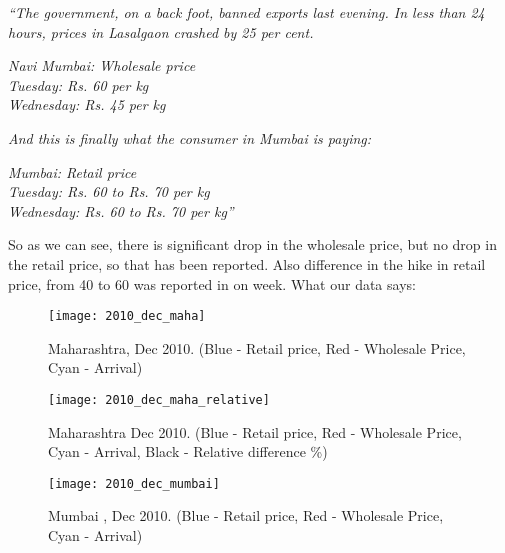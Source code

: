 \textit{“The government, on a back foot, banned exports last evening. In less than 24 hours, prices in Lasalgaon crashed by 25 per cent.}\\
\begin{center}
\textit{Navi Mumbai: Wholesale price } \\
\textit{Tuesday: Rs. 60 per kg }\\
\textit{Wednesday: Rs. 45 per kg }\\
\end{center}
\textit{And this is finally what the consumer in Mumbai is paying:}\\
\begin{center}
\textit{Mumbai: Retail price}\\
\textit{Tuesday: Rs. 60 to Rs. 70 per kg}\\
\textit{Wednesday: Rs. 60 to Rs. 70 per kg” }\\
\end{center}
So as we can see, there is significant drop in the wholesale price, but no drop in the retail price, so that has been reported. Also difference in the hike in retail price, from 40 to 60 was reported in on week. What our data says:

\begin{figure}[here]
\begin{center}	
\texttt{[image: 2010\_dec\_maha]} 
\caption{Maharashtra, Dec 2010. (Blue - Retail price, Red - Wholesale Price, Cyan - Arrival)}
\label{fig:MaharashtraDec2010}
\end{center}
\end{figure}

\begin{figure}[here]
\begin{center}	
\texttt{[image: 2010\_dec\_maha\_relative]} 
\caption{Maharashtra Dec 2010. (Blue - Retail price, Red - Wholesale Price, Cyan - Arrival, Black - Relative difference \%)}
\label{fig:MaharashtraDec2010Relativedifference}
\end{center}
\end{figure}

\begin{figure}[here]
\begin{center}	
\texttt{[image: 2010\_dec\_mumbai]} 
\caption{Mumbai , Dec 2010. (Blue - Retail price, Red - Wholesale Price, Cyan - Arrival)}
\label{fig:MumbaiDec2010}
\end{center}
\end{figure}

